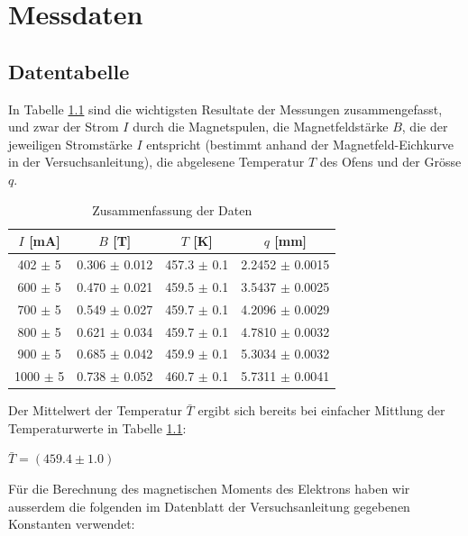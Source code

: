 \documentclass[a4paper,parskip,11pt, DIV12]{scrreprt}
\begin{document}
\clearpage

\chapter{Messdaten}

\section{Datentabelle}
In Tabelle \ref{tabelle1} sind die wichtigsten Resultate der Messungen zusammengefasst, und zwar der Strom $I$ durch die Magnetspulen, die Magnetfeldstärke $B$, die der jeweiligen Stromstärke $I$ entspricht (bestimmt anhand der Magnetfeld-Eichkurve in der Versuchsanleitung), die abgelesene Temperatur $T$ des Ofens und der Grösse $q$.\\

\begin{table}[H]
\centering
\renewcommand{\arraystretch}{1.2} %
\setlength{\tabcolsep}{3mm} %
\begin{tabular}{|c|c|c|c|} 
$I$ [mA] & 			$B$ [T] & 					$T$ [K]  & 		$q$ [mm]\\ \hline
402   $\pm$ 5      & 0.306   $\pm$ 0.012   & 457.3  $\pm$ 0.1   & 2.2452 $\pm$ 0.0015 \\
600    $\pm$ 5      & 0.470   $\pm$ 0.021   & 459.5  $\pm$ 0.1   &3.5437  $\pm$ 0.0025\\
700    $\pm$ 5      & 0.549   $\pm$ 0.027  & 459.7   $\pm$ 0.1   &4.2096  $\pm$ 0.0029\\
800    $\pm$ 5     & 0.621    $\pm$ 0.034 & 459.7    $\pm$ 0.1   & 4.7810 $\pm$  0.0032 \\
900    $\pm$ 5     & 0.685    $\pm$ 0.042 & 459.9    $\pm$ 0.1    &5.3034  $\pm$  0.0032 \\
1000    $\pm$ 5    & 0.738     $\pm$ 0.052 & 460.7       $\pm$ 0.1 &5.7311  $\pm$ 0.0041
\end{tabular}
\caption[Daten]{Zusammenfassung der Daten}\label{tabelle1}
\end{table} Der Mittelwert der Temperatur $\bar{T}$ ergibt sich bereits bei einfacher Mittlung der Temperaturwerte in Tabelle \ref{tabelle1}:
\begin{center}
$\bar{T} = (459.4 \pm 1.0)$
\end{center}

Für die Berechnung des magnetischen Moments des Elektrons haben wir ausserdem die folgenden im Datenblatt der Versuchsanleitung gegebenen Konstanten verwendet:
\end{document}
